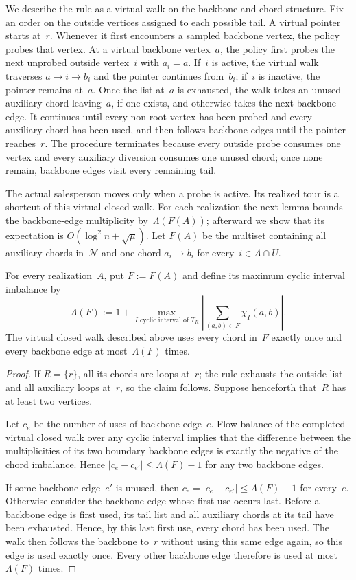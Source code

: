 \documentclass[12pt,a4paper,oneside]{report}
\begin{document}
We describe the rule as a virtual walk on the backbone-and-chord structure.
Fix an order on the outside vertices assigned to each possible tail.  A
virtual pointer starts at~$r$.  Whenever it first encounters a sampled
backbone vertex, the policy probes that vertex.  At a virtual backbone
vertex~$a$, the policy first probes the next unprobed outside vertex~$i$ with
$a_i=a$.  If~$i$ is active, the virtual walk traverses
$a\to i\to b_i$ and the pointer continues from~$b_i$; if~$i$ is inactive,
the pointer remains at~$a$.  Once the list at~$a$ is exhausted, the walk takes
an unused auxiliary chord leaving~$a$, if one exists, and otherwise takes the
next backbone edge.  It continues until every non-root vertex has been probed
and every auxiliary chord has been used, and then follows backbone edges until
the pointer reaches~$r$.
The procedure terminates because every outside probe consumes one vertex and
every auxiliary diversion consumes one unused chord; once none remain,
backbone edges visit every remaining tail.

The actual salesperson moves only when a probe is active.  Its realized tour
is a shortcut of this virtual closed walk.  For each realization the next
lemma bounds the backbone-edge multiplicity by~$\Lambda(F(A))$; afterward we
show that its expectation is $O(\log^2 n+\sqrt\mu)$.  Let $F(A)$ be the
multiset containing all auxiliary chords in~$\mathcal N$ and one chord
$a_i\to b_i$ for every~$i\in A\cap U$.

\begin{lemma}
\label{lem:active-first-stack-walk}
For every realization~$A$, put $F:=F(A)$ and define its maximum
cyclic interval imbalance by
\[
    \Lambda(F)
    :=1+\max_{I\text{ cyclic interval of }T_R}
      \left|\sum_{(a,b)\in F}\chi_I(a,b)\right|.
\]
The virtual closed walk described above uses every chord in~$F$ exactly once
and every
backbone edge at most~$\Lambda(F)$ times.
\end{lemma}

\begin{proof}
If $R=\{r\}$, all its chords are loops at~$r$;
the rule exhausts the outside list and all auxiliary loops at~$r$, so the
claim follows.
Suppose henceforth that~$R$ has at least two vertices.  

Let $c_e$ be the number of uses of backbone edge~$e$.  Flow balance of
the completed virtual closed walk over any cyclic interval implies that the
difference between the multiplicities of its two boundary backbone edges is
exactly the negative of the chord imbalance.  Hence
$|c_e-c_{e'}|\le\Lambda(F)-1$ for any two backbone edges.

If some backbone edge~$e'$ is unused, then
$c_e=|c_e-c_{e'}|\le\Lambda(F)-1$ for every~$e$.  Otherwise consider the
backbone edge whose first use occurs last.  Before a backbone edge is first
used, its tail list and all auxiliary chords at its tail have been exhausted.
Hence, by this last first use, every chord has been used.  The walk then
follows the backbone to~$r$ without using this same edge again, so this edge
is used exactly once.  Every other backbone edge therefore is used 
at most~$\Lambda(F)$ times.
\end{proof}
\end{document}

